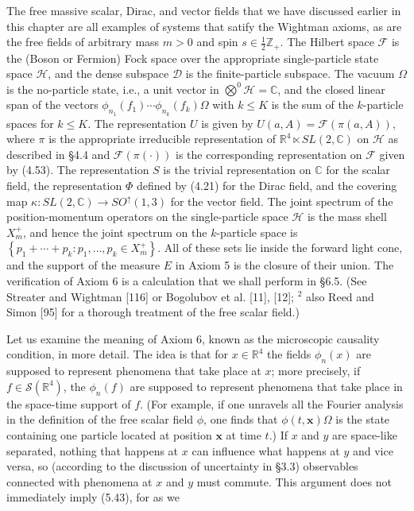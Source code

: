 \documentclass[10pt, letterpaper]{article}
\begin{document}
The free massive scalar, Dirac, and vector fields that we have discussed earlier in this chapter are all examples of systems that satify the Wightman axioms, as are the free fields of arbitrary mass $m>0$ and spin $s \in \frac{1}{2} \mathbb{Z}_{+}$. The Hilbert space $\mathcal{F}$ is the (Boson or Fermion) Fock space over the appropriate single-particle state space $\mathcal{H}$, and the dense subspace $\mathcal{D}$ is the finite-particle subspace. The vacuum $\Omega$ is the no-particle state, i.e., a unit vector in $\bigotimes^{0} \mathcal{H}=\mathbb{C}$, and the closed linear span of the vectors $\phi_{n_{1}}\left(f_{1}\right) \cdots \phi_{n_{k}}\left(f_{k}\right) \Omega$ with $k \leq K$ is the sum of the $k$-particle spaces for $k \leq K$. The representation $U$ is given by $U(a, A)=\mathcal{F}(\pi(a, A))$, where $\pi$ is the appropriate irreducible representation of $\mathbb{R}^{4} \ltimes S L(2, \mathbb{C})$ on $\mathcal{H}$ as described in §4.4 and $\mathcal{F}(\pi(\cdot))$ is the corresponding representation on $\mathcal{F}$ given by (4.53). The representation $S$ is the trivial representation on $\mathbb{C}$ for the scalar field, the representation $\Phi$ defined by (4.21) for the Dirac field, and the covering map $\kappa: S L(2, \mathbb{C}) \rightarrow S O^{\uparrow}(1,3)$ for the vector field. The joint spectrum of the position-momentum operators on the single-particle space $\mathcal{H}$ is the mass shell $X_{m}^{+}$, and hence the joint spectrum on the $k$-particle space is $\left\{p_{1}+\cdots+p_{k}: p_{1}, \ldots, p_{k} \in X_{m}^{+}\right\}$. All of these sets lie inside the forward light cone, and the support of the measure $E$ in Axiom 5 is the closure of their union. The verification of Axiom 6 is a calculation that we shall perform in §6.5. (See Streater and Wightman [116] or Bogolubov et al. [11], [12]; ${ }^{2}$ also Reed and Simon [95] for a thorough treatment of the free scalar field.)

Let us examine the meaning of Axiom 6, known as the microscopic causality condition, in more detail. The idea is that for $x \in \mathbb{R}^{4}$ the fields $\phi_{n}(x)$ are supposed to represent phenomena that take place at $x$; more precisely, if $f \in \mathcal{S}\left(\mathbb{R}^{4}\right)$, the $\phi_{n}(f)$ are supposed to represent phenomena that take place in the space-time support of $f$. (For example, if one unravels all the Fourier analysis in the definition of the free scalar field $\phi$, one finds that $\phi(t, \mathbf{x}) \Omega$ is the state containing one particle located at position $\mathbf{x}$ at time $t$.) If $x$ and $y$ are space-like separated, nothing that happens at $x$ can influence what happens at $y$ and vice versa, so (according to the discussion of uncertainty in §3.3) observables connected with phenomena at $x$ and $y$ must commute. This argument does not immediately imply (5.43), for as we
\end{document}
